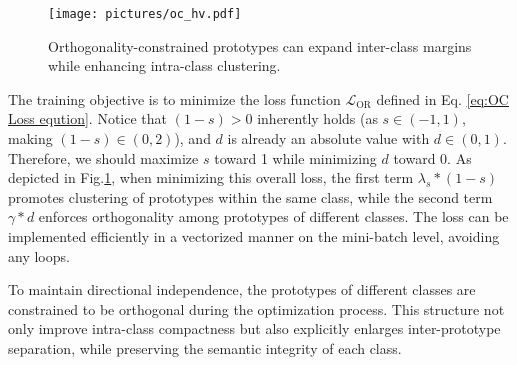 \begin{figure}[t]
    \centering
    \texttt{[image: pictures/oc\_hv.pdf]}
    \caption{Orthogonality-constrained prototypes can expand inter-class margins while enhancing intra-class clustering.}
    \label{fig:orthogonal constraint picture}
\end{figure}

The training objective is to minimize the loss function $\mathcal{L}_{\mathrm{OR}}$ defined in Eq. \ref{eq:OC Loss eqution}. Notice that $(1 - s) > 0$ inherently holds (as $s \in (-1, 1)$, making $(1 - s) \in (0, 2)$), and $d$ is already an absolute value with $d \in (0, 1)$. Therefore, we should maximize $s$ toward 1 while minimizing $d$ toward 0. 
As depicted in Fig.\ref{fig:orthogonal constraint picture}, when minimizing this overall loss, the first term $\lambda_s * (1 - s)$ promotes clustering of prototypes within the same class, while the second term $\gamma * d$ enforces orthogonality among prototypes of different classes. The loss can be implemented efficiently in a vectorized manner on the mini-batch level, avoiding any loops.

To maintain directional independence, the prototypes of different classes are constrained to be orthogonal during the optimization process. This structure not only improve intra-class compactness but also explicitly enlarges inter-prototype separation, while preserving the semantic integrity of each class. 

